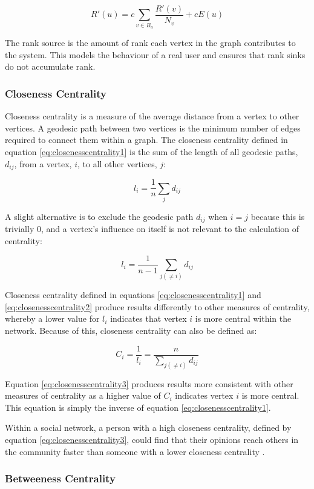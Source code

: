 \begin{equation}
R'(u) = c \sum_{v \in B_u} \frac{R'(v)}{N_v} + cE(u)
\label{eq:pagerank}
\end{equation}

The rank source is the amount of rank each vertex in the graph contributes to the system. This models the behaviour of a real user and ensures that rank sinks do not accumulate rank.

\subsubsection{Closeness Centrality}
Closeness centrality is a measure of the average distance from a vertex to other vertices. A geodesic path between two vertices is the minimum number of edges required to connect them within a graph. The closeness centrality defined in equation \ref{eq:closenesscentrality1} is the sum of the length of all geodesic paths, $d_{ij}$, from a vertex, $i$, to all other vertices, $j$:

\begin{equation}
l_i = \frac{1}{n}\sum_{j} d_{ij}
\label{eq:closenesscentrality1}
\end{equation}

A slight alternative is to exclude the geodesic path $d_{ij}$ when $i = j$ because this is trivially 0, and a vertex's influence on itself is not relevant to the calculation of centrality:

\begin{equation}
l_i = \frac{1}{n-1}\sum_{j(\neq i)} d_{ij}
\label{eq:closenesscentrality2}
\end{equation}

Closeness centrality defined in equations \ref{eq:closenesscentrality1} and \ref{eq:closenesscentrality2} produce results differently to other measures of centrality, whereby a lower value for $l_i$ indicates that vertex $i$ is more central within the network. Because of this, closeness centrality can also be defined as:

\begin{equation}
C_i = \frac{1}{l_i} = \frac{n}{\sum_{j(\neq i)} d_{ij}}
\label{eq:closenesscentrality3}
\end{equation}

Equation \ref{eq:closenesscentrality3} produces results more consistent with other measures of centrality as a higher value of $C_i$ indicates vertex $i$ is more central. This equation is simply the inverse of equation \ref{eq:closenesscentrality1}.

Within a social network, a person with a high closeness centrality, defined by equation \ref{eq:closenesscentrality3}, could find that their opinions reach others in the community faster than someone with a lower closeness centrality \cite{newman10}.

\subsubsection{Betweeness Centrality}
